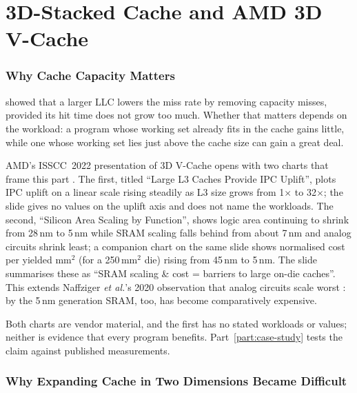 \clearpage
\part{3D-Stacked Cache and AMD 3D V-Cache}
\label{part:stacked-cache}

\section{Why Cache Capacity Matters}
\label{sec:why-cache-capacity}

 showed that a larger LLC lowers the miss rate by removing capacity misses, provided its hit time does not grow too much. Whether that matters depends on the workload: a program whose working set already fits in the cache gains little, while one whose working set lies just above the cache size can gain a great deal.

AMD's ISSCC~2022 presentation of 3D V-Cache opens with two charts that frame this part \cite[slides~5--6]{wuu2022vcache}. The first, titled ``Large L3 Caches Provide IPC Uplift'', plots IPC uplift on a linear scale rising steadily as L3 size grows from 1$\times$ to 32$\times$; the slide gives no values on the uplift axis and does not name the workloads. The second, ``Silicon Area Scaling by Function'', shows logic area continuing to shrink from 28\,nm to 5\,nm while SRAM scaling falls behind from about 7\,nm and analog circuits shrink least; a companion chart on the same slide shows normalised cost per yielded mm$^2$ (for a 250\,mm$^2$ die) rising from 45\,nm to 5\,nm. The slide summarises these as ``SRAM scaling \& cost = barriers to large on-die caches''. This extends Naffziger \emph{et al.}'s 2020 observation that analog circuits scale worst \cite{naffziger2020chiplet}: by the 5\,nm generation SRAM, too, has become comparatively expensive.

Both charts are vendor material, and the first has no stated workloads or values; neither is evidence that every program benefits. Part~\ref{part:case-study} tests the claim against published measurements.

\section{Why Expanding Cache in Two Dimensions Became Difficult}
\label{sec:planar-limits}

